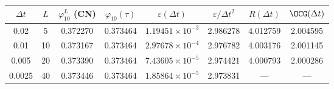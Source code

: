 \begin{tabular}{cccccccc}\toprule
$\Delta t$ & $L$ & $\varphi_{10}^{L}$ (CN) & $\varphi_{10}(\tau)$ & $\varepsilon(\Delta t)$ & $\varepsilon/\Delta t^2$ & $R(\Delta t)$ & $\OCG(\Delta t)$\\\midrule
0.02 & 5 & 0.372270 & 0.373464 & $1.19451\times10^{-3}$ & 2.986278 & 4.012759 & 2.004595\\
0.01 & 10 & 0.373167 & 0.373464 & $2.97678\times10^{-4}$ & 2.976782 & 4.003176 & 2.001145\\
0.005 & 20 & 0.373390 & 0.373464 & $7.43605\times10^{-5}$ & 2.974421 & 4.000793 & 2.000286\\
0.0025 & 40 & 0.373446 & 0.373464 & $1.85864\times10^{-5}$ & 2.973831 & --- & ---\\
\bottomrule
\end{tabular}
